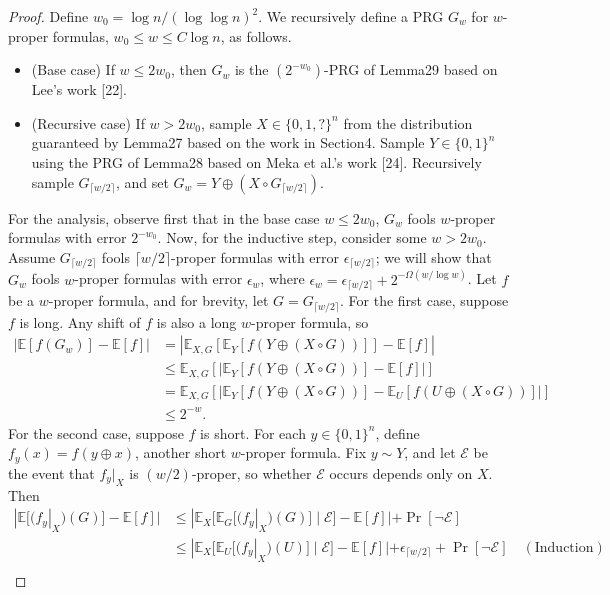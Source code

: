 \begin{proof}
Define $w_0=\log n/(\log\log n)^2$. We recursively define a PRG $G_w$ for $w$-proper formulas, $w_0\le w\le C\log n$, as follows.
\begin{itemize}
\item (Base case) If $w\le2w_0$, then $G_w$ is the $(2^{-w_0})$-PRG of Lemma29 based on Lee's work [22].
\item (Recursive case) If $w>2w_0$, sample $X\in\{0,1,?\}^n$ from the distribution guaranteed by Lemma27 based on the work in Section4. Sample $Y\in\{0,1\}^n$ using the PRG of Lemma28 based on Meka et al.'s work [24]. Recursively sample $G_{\lceil w/2\rceil}$, and set $G_w=Y\oplus(X\circ G_{\lceil w/2\rceil})$.
\end{itemize}
For the analysis, observe first that in the base case $w\le2w_0$, $G_w$ fools $w$-proper formulas with error $2^{-w_0}$. Now, for the inductive step, consider some $w>2w_0$. Assume $G_{\lceil w/2\rceil}$ fools $\lceil w/2\rceil$-proper formulas with error $\epsilon_{\lceil w/2\rceil}$; we will show that $G_w$ fools $w$-proper formulas with error $\epsilon_w$, where $\epsilon_w=\epsilon_{\lceil w/2\rceil}+2^{-\Omega(w/\log w)}$.
Let $f$ be a $w$-proper formula, and for brevity, let $G=G_{\lceil w/2\rceil}$. For the first case, suppose $f$ is long. Any shift of $f$ is also a long $w$-proper formula, so
\begin{align*}
|\mathbb E[f(G_w)]-\mathbb E[f]|
&=\left|\mathbb E_{X,G}[\mathbb E_Y[f(Y\oplus(X\circ G))]]-\mathbb E[f]\right|\\
&\le\mathbb E_{X,G}[|\mathbb E_Y[f(Y\oplus(X\circ G))]-\mathbb E[f]|]\\
&=\mathbb E_{X,G}[|\mathbb E_Y[f(Y\oplus(X\circ G))]-\mathbb E_U[f(U\oplus(X\circ G))]|]\\
&\le2^{-w}.
\end{align*}
For the second case, suppose $f$ is short. For each $y\in\{0,1\}^n$, define $f_y(x)=f(y\oplus x)$, another short $w$-proper formula. Fix $y\sim Y$, and let $\mathcal E$ be the event that $f_y|_X$ is $(w/2)$-proper, so whether $\mathcal E$ occurs depends only on $X$. Then
\begin{align*}
|\mathbb E[(f_y|_X)(G)]-\mathbb E[f]|
&\le|\mathbb E_X[\mathbb E_G[(f_y|_X)(G)]\mid\mathcal E]-\mathbb E[f]|+\Pr[\neg\mathcal E]\\
&\le|\mathbb E_X[\mathbb E_U[(f_y|_X)(U)]\mid\mathcal E]-\mathbb E[f]|
+\epsilon_{\lceil w/2\rceil}+\Pr[\neg\mathcal E]\quad(\text{Induction})\\

\end{align*}
\end{proof}
